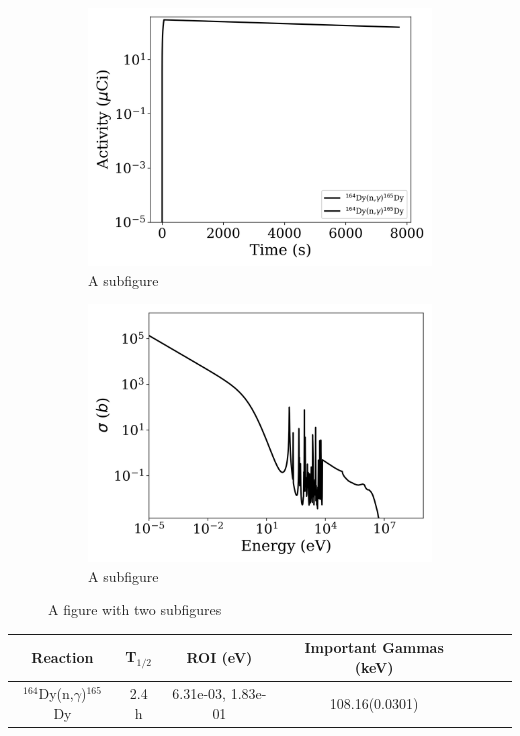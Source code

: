 \begin{figure}[h]
\centering
\begin{subfigure}{.5\textwidth}
  \centering
     \includegraphics[width=.8\textwidth]{plot/Dy-164(n,gamma)Dy-165_library1} 

  \caption{A subfigure}
  \label{fig:sub1}
\end{subfigure}%
\begin{subfigure}{.5\textwidth}
  \centering
     \includegraphics[width=.8\textwidth]{plot/Dy-164(n,gamma)Dy-165} 

  \caption{A subfigure}
  \label{fig:sub2}
\end{subfigure}
\caption{A figure with two subfigures}
\label{fig:test}
\end{figure}

\begin{table}[h]
\centering
\begin{tabular}{ |c|c|c|c|c|c|c| }
 \hline
 Reaction & T$_{1/2}$ & ROI (eV) & Important Gammas (keV) \\
 \hline 
 $^{164}$Dy(n,$\gamma$)$^{165}$Dy &  2.4 h & 6.31e-03, 1.83e-01 & 108.16(0.0301) \\ 
\hline
\end{tabular}
\end{table}
